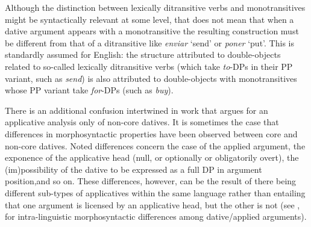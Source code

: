 \documentclass[output=paper,colorlinks,citecolor=brown,nonflat]{./langscibook}
\begin{document}
Although the distinction between lexically ditransitive verbs and monotransitives might be syntactically relevant at some level, that does not mean that when a dative argument appears with a monotransitive the resulting construction must be different from that of a ditransitive like \textit{enviar} ‘send’ or \textit{poner} ‘put’.  This is standardly assumed for English: the structure attributed to double-objects related to so-called lexically ditransitive verbs (which take \textit{to}-DPs in their PP variant, such as \textit{send}) is also attributed to double-objects with monotransitives whose PP variant take \textit{for}-DPs (such as \textit{buy}).

There is an additional confusion intertwined in work that argues for an applicative analysis only of non-core datives. It is sometimes the case that differences in morphosyntactic properties have been observed between core and non-core datives. Noted differences concern the case of the applied argument, the exponence of the applicative head (null, or optionally or obligatorily overt), the (im)possibility of the dative to be expressed as a full DP in argument position,and so on. These differences, however, can be the result of there being different sub-types of applicatives within the same language rather than entailing that one argument is licensed by an applicative head, but the other is not (see \citealt{BonehNash2012, Cuervo2003,Cuervo2015Syntax,Diaconescu2004, Pineda2016, RobergeTroberg2009}, for intra-linguistic morphosyntactic differences among dative/applied arguments).
\end{document}
